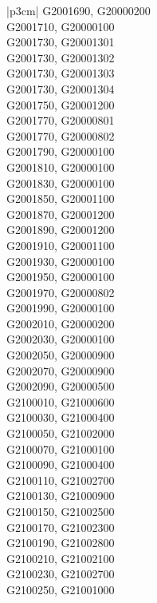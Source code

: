 \begin{customLongTable}{ |p{3cm}| }
G2001690, G20000200 \\ \hline
G2001710, G20000100 \\ \hline
G2001730, G20001301 \\ \hline
G2001730, G20001302 \\ \hline
G2001730, G20001303 \\ \hline
G2001730, G20001304 \\ \hline
G2001750, G20001200 \\ \hline
G2001770, G20000801 \\ \hline
G2001770, G20000802 \\ \hline
G2001790, G20000100 \\ \hline
G2001810, G20000100 \\ \hline
G2001830, G20000100 \\ \hline
G2001850, G20001100 \\ \hline
G2001870, G20001200 \\ \hline
G2001890, G20001200 \\ \hline
G2001910, G20001100 \\ \hline
G2001930, G20000100 \\ \hline
G2001950, G20000100 \\ \hline
G2001970, G20000802 \\ \hline
G2001990, G20000100 \\ \hline
G2002010, G20000200 \\ \hline
G2002030, G20000100 \\ \hline
G2002050, G20000900 \\ \hline
G2002070, G20000900 \\ \hline
G2002090, G20000500 \\ \hline
G2100010, G21000600 \\ \hline
G2100030, G21000400 \\ \hline
G2100050, G21002000 \\ \hline
G2100070, G21000100 \\ \hline
G2100090, G21000400 \\ \hline
G2100110, G21002700 \\ \hline
G2100130, G21000900 \\ \hline
G2100150, G21002500 \\ \hline
G2100170, G21002300 \\ \hline
G2100190, G21002800 \\ \hline
G2100210, G21002100 \\ \hline
G2100230, G21002700 \\ \hline
G2100250, G21001000 \\ \hline

\end{customLongTable}
